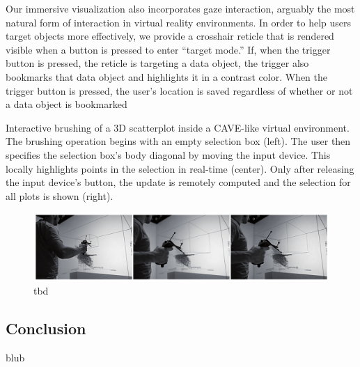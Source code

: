 Our immersive visualization also incorporates gaze interaction, arguably the most natural form of interaction in virtual reality environments. In order to help users target objects more effectively, we provide a crosshair reticle that is rendered visible when a button is pressed to enter “target mode.” If, when the trigger button is pressed, the reticle is targeting a data object, the trigger also bookmarks that data object and highlights it in a contrast color. When the trigger button is pressed, the user’s location is saved regardless of whether or not a data object is bookmarked \cite{Drouhard2015}



Interactive brushing of a 3D scatterplot inside a CAVE-like virtual environment. The brushing operation begins with an empty selection box (left). The user then specifies the selection box’s body diagonal by moving the input device. This locally highlights points in the selection in real-time (center). Only after releasing the input device’s button, the update is remotely computed and the selection for all plots is shown (right). \citep{Hentschel2009}
\begin{figure}[h]
	\begin{center}
		\includegraphics[width=14cm]{03_Figures/05_LitReview/Hentschel2009_InteractiveBrushing.png}
		\caption[tbd]{tbd \citep{Hentschel2009}}
		\label{fig:interactivebrushing}
	\end{center}
\end{figure}



\subsection{Conclusion}

blub




